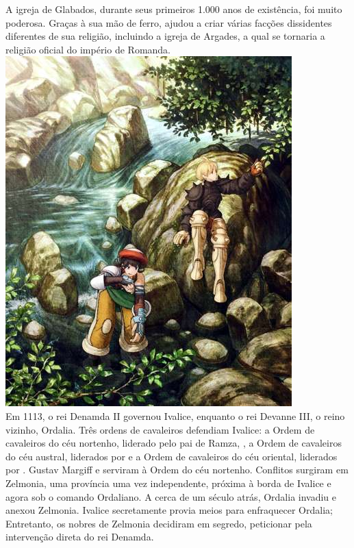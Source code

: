 A igreja de Glabados, durante seus primeiros 1.000 anos de existência, foi muito poderosa. Graças à sua mão de ferro, ajudou a criar várias facções dissidentes diferentes de sua religião, incluindo a igreja de Argades, a qual se tornaria a religião oficial do império de Romanda.
%
\ofpar
\includegraphics[width=\columnwidth]{./art/worldbook/luso.jpg}
\ofpar
%
\\
Em 1113, o rei Denamda II governou Ivalice, enquanto o rei Devanne III, o reino vizinho, Ordalia.
Três ordens de cavaleiros defendiam Ivalice: a Ordem de cavaleiros do céu nortenho, liderado pelo pai de Ramza, , a Ordem de cavaleiros do céu austral, liderados por  e a Ordem de cavaleiros do céu oriental, liderados por .
Gustav Margiff e  serviram à Ordem do céu nortenho.
Conflitos surgiram em Zelmonia, uma província uma vez independente, próxima à borda de Ivalice e agora sob o comando Ordaliano.
A cerca de um século atrás, Ordalia invadiu e anexou Zelmonia.
Ivalice secretamente provia meios para enfraquecer Ordalia; Entretanto, os nobres de Zelmonia decidiram em segredo, peticionar pela intervenção direta do rei Denamda.
